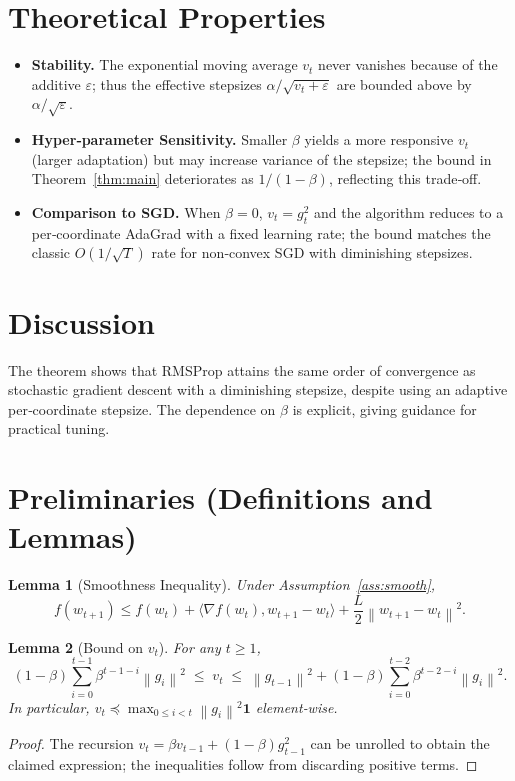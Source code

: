 \documentclass{article}
\newtheorem{lemma}{Lemma}
\newcommand{\norm}[1]{\left\|#1\right\|}
\begin{document}
\section*{Theoretical Properties}
\begin{itemize}
\item \textbf{Stability.} The exponential moving average $v_{t}$ never vanishes because of the additive $\varepsilon$; thus the effective stepsizes $\alpha/\sqrt{v_{t}+\varepsilon}$ are bounded above by $\alpha/\sqrt{\varepsilon}$.
\item \textbf{Hyper‑parameter Sensitivity.} Smaller $\beta$ yields a more responsive $v_{t}$ (larger adaptation) but may increase variance of the stepsize; the bound in Theorem~\ref{thm:main} deteriorates as $1/(1-\beta)$, reflecting this trade‑off.
\item \textbf{Comparison to SGD.} When $\beta=0$, $v_{t}=g_{t}^{2}$ and the algorithm reduces to a per‑coordinate AdaGrad with a fixed learning rate; the bound matches the classic $O(1/\sqrt{T})$ rate for non‑convex SGD with diminishing stepsizes.
\end{itemize}

\section*{Discussion}
The theorem shows that RMSProp attains the same order of convergence as stochastic gradient descent with a diminishing stepsize, despite using an adaptive per‑coordinate stepsize. The dependence on $\beta$ is explicit, giving guidance for practical tuning.

\newpage
\section*{Preliminaries (Definitions and Lemmas)}
\begin{lemma}[Smoothness Inequality]\label{lem:smooth}
Under Assumption~\ref{ass:smooth},
\[
f(w_{t+1})\le f(w_{t})+\langle\nabla f(w_{t}),w_{t+1}-w_{t}\rangle+\frac{L}{2}\norm{w_{t+1}-w_{t}}^{2}.
\]
\end{lemma}
\begin{lemma}[Bound on $v_{t}$]\label{lem:vt}
For any $t\ge1$,
\[
(1-\beta) \sum_{i=0}^{t-1}\beta^{t-1-i}\norm{g_{i}}^{2}\;\le\; v_{t}\;\le\; \norm{g_{t-1}}^{2}+ (1-\beta)\sum_{i=0}^{t-2}\beta^{t-2-i}\norm{g_{i}}^{2}.
\]
In particular, $v_{t}\preceq \max_{0\le i<t}\norm{g_{i}}^{2}\mathbf{1}$ element‑wise.
\end{lemma}
\begin{proof}
The recursion $v_{t}= \beta v_{t-1}+(1-\beta)g_{t-1}^{2}$ can be unrolled to obtain the claimed expression; the inequalities follow from discarding positive terms. \qedhere
\end{proof}
\end{document}
